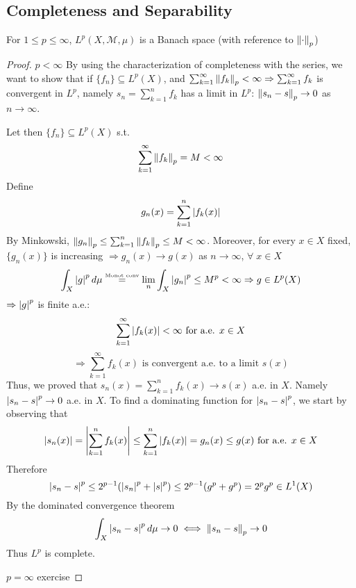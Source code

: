 \subsection*{Completeness and Separability}
\begin{theorem}
    For \(1 \leq p \leq \infty\), \(L^p(X, \mathcal{M}, \mu)\) is a Banach space (with reference to \(\norm{\cdot}_p\))
\end{theorem}
\begin{proof}
    \item \(p < \infty\)
    By using the characterization of completeness with the series, we want to show that 
    if \(\{f_n\} \subseteq L^p(X)\), and \(\sum_{k=1}^\infty\norm{f_k}_p < \infty \Rightarrow \sum_{k=1}^\infty f_k \) is convergent in \(L^p\), 
    namely \(s_n = \sum_{k=1}^n f_k\) has a limit in \(L^p\): \(\norm{s_n -s}_p \to 0 \) as \(n \to \infty\). 

    Let then \(\{f_n\} \subseteq L^p(X)\) s.t. 
    \[
        \sum_{k=1}^\infty \norm{f_k}_p = M < \infty 
    \]
    Define 
    \[
        g_n(x) = \sum_{k=1}^n \abs{f_k(x)}
    \]
    By Minkowski, \(\norm{g_n}_p \leq \sum_{k=1}^n \norm{f_k}_p \leq M < \infty\). 
    Moreover, for every \(x \in X\) fixed, \(\{g_n(x)\}\) is increasing \(\Rightarrow g_n(x) \to g(x)\) as \(n \to \infty\), \(\forall\; x \in X\)
    \[
        \int_X \abs{g}^p \, d\mu \overset{\text{\tiny{Monot conv}}}{=} \lim_n \int_X \abs{g_n}^p \leq M^p < \infty \Rightarrow g \in L^p(X)
    \]
    \(\Rightarrow \abs{g}^p \) is finite a.e.:
    \[
        \sum_{k=1}^\infty \abs{f_k(x)} < \infty \text{  for a.e. } x \in X
    \]
    \[
        \Rightarrow \sum_{k=1}^\infty f_k(x) \text{ is convergent a.e. to a limit } s(x)
    \]
    Thus, we proved that \(s_n(x) = \sum_{k=1}^n f_k(x) \to s(x)\) a.e. in \(X\). Namely \(\abs{s_n - s }^p \to 0\) a.e. in \(X\). To find a dominating function for \(\abs{s_n -s}^p\), we start by observing that
    \[
        \abs{s_n(x)} = \abs{\sum_{k=1}^n f_k(x)} \leq \sum_{k=1}^n \abs{f_k(x)} = g_n(x) \leq g(x) \text{ for a.e. } x \in X
    \]
    Therefore
    \[
        \abs{s_n -s }^p \leq 2^{p-1}(\abs{s_n}^p + \abs{s}^p) \leq 2^{p-1} (g^p + g^p ) = 2^p g^p \in L^1(X)
    \]
    By the dominated convergence theorem
    \[
        \int_X \abs{s_n -s }^p \, d\mu \to 0 \iff \norm{s_n -s}_p \to 0
    \]
    Thus \(L^p\) is complete.
    \item \(p=\infty\) exercise
\end{proof}

